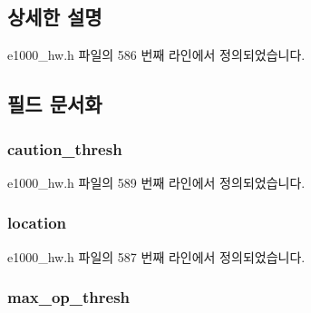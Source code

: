 \subsection{상세한 설명}


e1000\+\_\+hw.\+h 파일의 586 번째 라인에서 정의되었습니다.



\subsection{필드 문서화}
\subsubsection[{\texorpdfstring{caution\+\_\+thresh}{caution_thresh}}]{ caution\+\_\+thresh}\hypertarget{structe1000__thermal__diode__data_a4075977884f97fa79135799050221023}{}\label{structe1000__thermal__diode__data_a4075977884f97fa79135799050221023}


e1000\+\_\+hw.\+h 파일의 589 번째 라인에서 정의되었습니다.

\subsubsection[{\texorpdfstring{location}{location}}]{ location}\hypertarget{structe1000__thermal__diode__data_a8022b2caf1f3855a19b16faf4c9cd43d}{}\label{structe1000__thermal__diode__data_a8022b2caf1f3855a19b16faf4c9cd43d}


e1000\+\_\+hw.\+h 파일의 587 번째 라인에서 정의되었습니다.

\subsubsection[{\texorpdfstring{max\+\_\+op\+\_\+thresh}{max_op_thresh}}]{ max\+\_\+op\+\_\+thresh}\hypertarget{structe1000__thermal__diode__data_a83c0353949e3a2fd5cec2d8da933c21f}{}\label{structe1000__thermal__diode__data_a83c0353949e3a2fd5cec2d8da933c21f}



